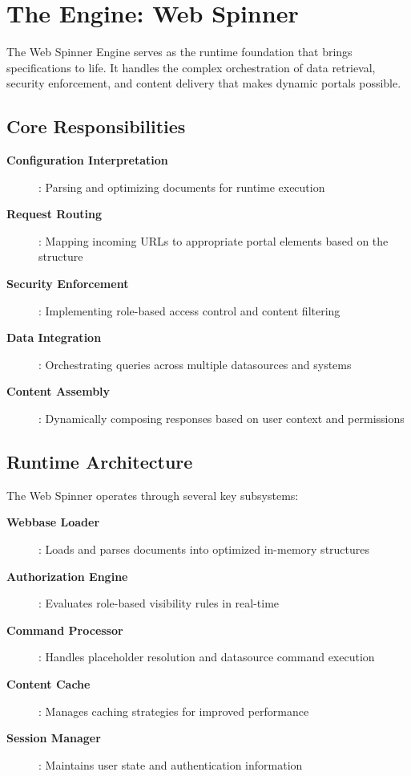 \section{The Engine: Web Spinner}
\label{sec:engine-spinner}

The Web Spinner Engine serves as the runtime foundation that brings \wbdl{} specifications to life. It handles the complex orchestration of data retrieval, security enforcement, and content delivery that makes dynamic portals possible.

\subsection{Core Responsibilities}

\begin{description}
\item[\textbf{Configuration Interpretation}]: Parsing and optimizing \wbdl{} documents for runtime execution
\item[\textbf{Request Routing}]: Mapping incoming URLs to appropriate portal elements based on the \webbase{} structure
\item[\textbf{Security Enforcement}]: Implementing role-based access control and content filtering
\item[\textbf{Data Integration}]: Orchestrating queries across multiple datasources and systems
\item[\textbf{Content Assembly}]: Dynamically composing responses based on user context and permissions
\end{description}

\subsection{Runtime Architecture}

The Web Spinner operates through several key subsystems:

\begin{description}
\item[\textbf{Webbase Loader}]: Loads and parses \wbdl{} documents into optimized in-memory structures
\item[\textbf{Authorization Engine}]: Evaluates role-based visibility rules in real-time
\item[\textbf{Command Processor}]: Handles \wbpl{} placeholder resolution and datasource command execution
\item[\textbf{Content Cache}]: Manages caching strategies for improved performance
\item[\textbf{Session Manager}]: Maintains user state and authentication information
\end{description}

